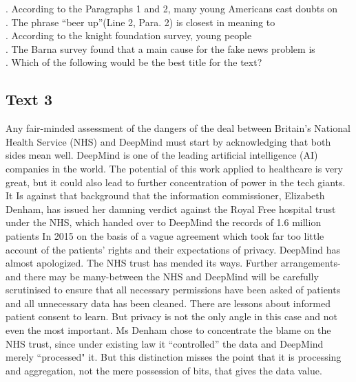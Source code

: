 \begin{questions} . According to the Paragraphs 1 and 2, many young Americans cast doubts on
\\ . The phrase “beer up”(Line 2, Para. 2) is closest in meaning to
\\ . According to the knight foundation survey, young people
\\ . The Barna survey found that a main cause for the fake news problem is
\\ . Which of the following would be the best title for the text?
\\ \end{questions}      \subsection{Text 3}
Any fair-minded assessment of the dangers of the deal between Britain's National Health Service (NHS) and DeepMind must start by acknowledging that both sides mean well. DeepMind is one of the leading artificial intelligence (AI) companies in the world. The potential of this work applied to healthcare is very great, but it could also lead to further concentration of power in the tech giants. It Is against that background that the information commissioner, Elizabeth Denham, has issued her damning verdict against the Royal Free hospital trust under the NHS, which handed over to DeepMind the records of 1.6 million patients In 2015 on the basis of a vague agreement which took far too little account of the patients' rights and their expectations of privacy.
DeepMind has almost apologized. The NHS trust has mended its ways. Further arrangements- and there may be many-between the NHS and DeepMind will be carefully scrutinised to ensure that all necessary permissions have been asked of patients and all unnecessary data has been cleaned. There are lessons about informed patient consent to learn. But privacy is not the only angle in this case and not even the most important. Ms Denham chose to concentrate the blame on the NHS trust, since under existing law it “controlled” the data and DeepMind merely “processed" it. But this distinction misses the point that it is processing and aggregation, not the mere possession of bits, that gives the data value.
